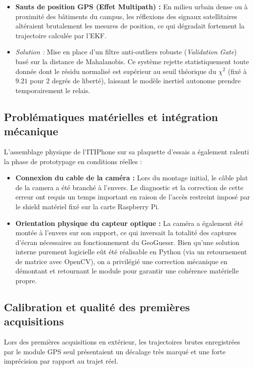 \begin{itemize}
    \item \textbf{Sauts de position GPS (Effet Multipath) :} En milieu urbain dense ou à proximité des bâtiments du campus, les réflexions des signaux satellitaires altéraient brutalement les mesures de position, ce qui dégradait fortement la trajectoire calculée par l'EKF.
    \item \textit{Solution :} Mise en place d'un filtre anti-outliers robuste (\textit{Validation Gate}) basé sur la distance de Mahalanobis. Ce système rejette statistiquement toute donnée dont le résidu normalisé est supérieur au seuil théorique du $\chi^2$ (fixé à $9.21$ pour 2 degrés de liberté), laissant le modèle inertiel autonome prendre temporairement le relais.
\end{itemize}

\subsection{Problématiques matérielles et intégration mécanique}
L'assemblage physique de l'ITIPhone sur sa plaquette d'essais a également ralenti la phase de prototypage en conditions réelles :

\begin{itemize}
    \item \textbf{Connexion du cable de la caméra :} Lors du montage initial, le câble plat de la camera a été branché à l'envers. Le diagnostic et la correction de cette erreur ont requis un temps important en raison de l'accès restreint imposé par le shield matériel fixé sur la carte Raspberry Pi.
    \item \textbf{Orientation physique du capteur optique :} La caméra a également été montée à l'envers sur son support, ce qui inversait la totalité des captures d'écran nécessaires au fonctionnement du GeoGuessr. Bien qu'une solution interne purement logicielle eût été réalisable en Python (via un retournement de matrice avec OpenCV), on a privilégié une correction mécanique en démontant et retournant le module pour garantir une cohérence matérielle propre.
\end{itemize}

\subsection{Calibration et qualité des premières acquisitions}
Lors des premières acquisitions en extérieur, les trajectoires brutes enregistrées par le module GPS seul présentaient un décalage très marqué et une forte imprécision par rapport au trajet réel. 

